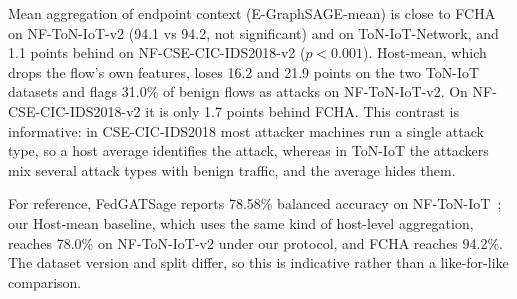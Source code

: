\documentclass[journal]{IEEEtran}
\begin{document}
Mean aggregation of endpoint context (E-GraphSAGE-mean) is close to FCHA on NF-ToN-IoT-v2 (94.1 vs 94.2, not significant) and on ToN-IoT-Network, and 1.1 points behind on NF-CSE-CIC-IDS2018-v2 ($p<0.001$). Host-mean, which drops the flow's own features, loses 16.2 and 21.9 points on the two ToN-IoT datasets and flags 31.0\% of benign flows as attacks on NF-ToN-IoT-v2. On NF-CSE-CIC-IDS2018-v2 it is only 1.7 points behind FCHA. This contrast is informative: in CSE-CIC-IDS2018 most attacker machines run a single attack type, so a host average identifies the attack, whereas in ToN-IoT the attackers mix several attack types with benign traffic, and the average hides them.

For reference, FedGATSage reports 78.58\% balanced accuracy on NF-ToN-IoT~\cite{altfaily2025fedgatsage}; our Host-mean baseline, which uses the same kind of host-level aggregation, reaches 78.0\% on NF-ToN-IoT-v2 under our protocol, and FCHA reaches 94.2\%. The dataset version and split differ, so this is indicative rather than a like-for-like comparison.
\end{document}
